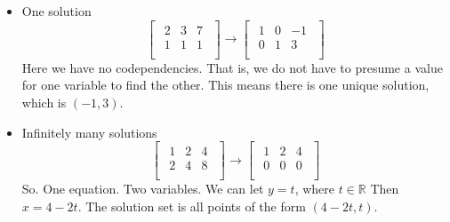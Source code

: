 \documentclass{article}
\begin{document}
\begin{itemize}
    \item One solution
    \[
    \begin{bmatrix}
        \begin{array}{cc|c}
            2 & 3 &  7 \\
            1 & 1 &  1 \\
        \end{array}
    \end{bmatrix}
    \xrightarrow{}
    \begin{bmatrix}     
        \begin{array}{cc|c}
            1 & 0 &  -1 \\
            0 & 1 &  3 \\
        \end{array} 
    \end{bmatrix}
    \]
    Here we have no codependencies. That is, we do not
    have to presume a value for one variable to find the other.
    This means there is one unique solution, which is $(-1, 3)$.
    \item Infinitely many solutions
    \[
    \begin{bmatrix}
        \begin{array}{cc|c}
            1 & 2 &  4 \\
            2 & 4 &  8 \\
        \end{array}
    \end{bmatrix}
    \xrightarrow{}
    \begin{bmatrix}
        \begin{array}{cc|c}
            1 & 2 &  4 \\
            0 & 0 &  0 \\
        \end{array}
    \end{bmatrix}
    \]
    So. One equation. Two variables.
    We can let $y=t$, where $t \in \mathbb{R}$
    Then $x = 4 - 2t$. The solution set is all points of the form $(4 - 2t, t)$.
\end{itemize}
\end{document}
